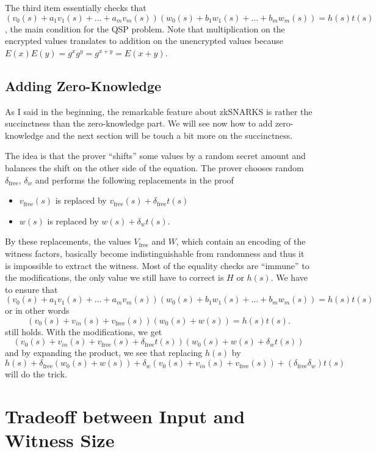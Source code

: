 \documentclass[11pt,letterpaper]{article}
\begin{document}
The third item essentially checks that $(v_{0}(s) + a_{1}v_{1}(s) +  \dots  + a_{m}v_{m}(s)) (w_{0}(s) + b_{1}w_{1}(s) +  \dots  + b_{m}w_{m}(s)) = h(s) t(s)$, the main condition for the QSP problem. Note that multiplication on the encrypted values translates to addition on the unencrypted values because $E(x) E(y) = g^{x} g^{y} = g^{x+y} = E(x + y)$.

\subsection{Adding Zero-Knowledge}


As I said in the beginning, the remarkable feature about zkSNARKS is rather the succinctness than the zero-knowledge part. We will see now how to add zero-knowledge and the next section will be touch a bit more on the succinctness.


The idea is that the prover ``shifts'' some values by a random secret amount and balances the shift on the other side of the equation. The prover chooses random $\delta _\mathrm{free}$, $\delta _{w}$ and performs the following replacements in the proof
\begin{itemize}
\item $v_\mathrm{free}(s)$ is replaced by $v_\mathrm{free}(s) + \delta _\mathrm{free} t(s)$
\item $w(s)$ is replaced by $w(s) + \delta _{w} t(s)$.
\end{itemize}


By these replacements, the values $V_\mathrm{free}$ and $W$, which contain an encoding of the witness factors, basically become indistinguishable from randomness and thus it is impossible to extract the witness. Most of the equality checks are ``immune'' to the modifications, the only value we still have to correct is $H$ or $h(s)$. We have to ensure that
\[ (v_{0}(s) + a_{1}v_{1}(s) +  \dots  + a_{m}v_{m}(s)) (w_{0}(s) + b_{1}w_{1}(s) +  \dots  + b_{m}w_{m}(s)) = h(s) t(s)\]
or in other words
\[(v_{0}(s) + v_{in}(s) + v_\mathrm{free}(s)) (w_{0}(s) + w(s)) = h(s) t(s).\]
still holds. With the modifications, we get
\[ (v_{0}(s) + v_{in}(s) + v_\mathrm{free}(s) + \delta _\mathrm{free} t(s)) (w_{0}(s) + w(s) + \delta _{w} t(s))
\]
and by expanding the product, we see that replacing $h(s)$ by
\[
    h(s) + \delta _\mathrm{free} (w_{0}(s) + w(s)) + \delta _{w} (v_{0}(s) + v_{in}(s) + v_\mathrm{free}(s)) + (\delta _\mathrm{free} \delta _{w}) t(s)
\]
will do the trick.

\section{Tradeoff between Input and Witness Size}
\end{document}
